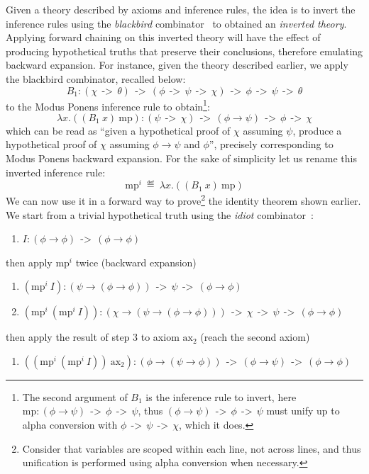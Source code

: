 \documentclass{easychair}
\newcommand{\arrowtype}{\ \ \text{->}\ \ }
\newcommand{\axtw}{\text{ax}_2}
\newcommand{\axmp}{\text{mp}}
\newcommand{\axmpi}{\text{mp}^i}
\newcommand{\blackbird}{B_1}
\newcommand{\idiot}{I}
\newcommand{\av}{\phi}
\newcommand{\bv}{\psi}
\newcommand{\cv}{\chi}
\newcommand{\dv}{\theta}
\begin{document}
Given a theory described by axioms and inference rules, the idea is to
invert the inference rules using the \emph{blackbird}
combinator~\cite{Smullyan1992ToMock} to obtained an \emph{inverted
  theory}.  Applying forward chaining on this inverted theory will
have the effect of producing hypothetical truths that preserve their
conclusions, therefore emulating backward expansion.  For instance,
given the theory described earlier, we apply the blackbird combinator,
recalled below:
$$\blackbird : (\cv \arrowtype \dv) \arrowtype (\av \arrowtype \bv \arrowtype \cv) \arrowtype \av \arrowtype \bv \arrowtype \dv$$
to the Modus Ponens inference rule to obtain\footnote{The second
  argument of $\blackbird$ is the inference rule to invert, here
  $\axmp : ( \phi \to \psi ) \arrowtype \phi \arrowtype \psi$, thus
  $( \phi \to \psi ) \arrowtype \phi \arrowtype \psi$ must unify up to
  alpha conversion with $\av \arrowtype \bv \arrowtype \cv$, which it
  does.}:
$$\lambda x.((\blackbird\ x)\ \axmp) : (\bv \arrowtype \cv) \arrowtype (\av
\to \bv) \arrowtype \av \arrowtype \cv$$ which can be read as ``given
a hypothetical proof of $\cv$ assuming $\bv$, produce a hypothetical
proof of $\cv$ assuming $\av \to \bv$ and $\av$'', precisely
corresponding to Modus Ponens backward expansion.  For the sake of
simplicity let us rename this inverted inference rule:
$$\axmpi\ \eqdef\ \lambda x.((\blackbird\ x)\ \axmp)$$
We can now use it in a forward way to prove\footnote{Consider that
  variables are scoped within each line, not across lines, and thus
  unification is performed using alpha conversion when necessary.}
the identity theorem shown earlier.  We start from a trivial
hypothetical truth using the \emph{idiot}
combinator~\cite{Smullyan1992ToMock}:
\begin{enumerate}
\item[1.] $\idiot : (\av \to \av) \arrowtype (\av \to \av)$
\end{enumerate}
then apply $\axmpi$ twice (backward expansion)
\begin{enumerate}
\item[2.]
  $(\axmpi\ \idiot) : (\psi \to (\av \to \av)) \arrowtype \psi
  \arrowtype (\av \to \av)$
\item[3.]
  $(\axmpi\ (\axmpi\ \idiot)) : (\chi \to (\psi \to (\av \to \av)))
  \arrowtype \chi \arrowtype \psi \arrowtype (\av \to \av)$
\end{enumerate}
then apply the result of step 3 to axiom $\axtw$ (reach the second axiom)
\begin{enumerate}
\item[4.]
  $((\axmpi\ (\axmpi\ \idiot))\ \axtw) : (\av \to (\bv \to \av)) \arrowtype (\av \to \bv) \arrowtype (\av \to \av)$
\end{enumerate}
\end{document}
